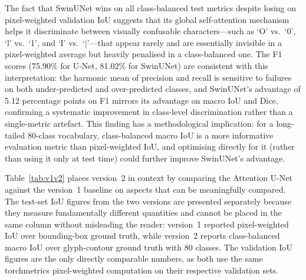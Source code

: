 \documentclass[a4paper,11pt]{article}
\begin{document}
The fact that SwinUNet wins on all class-balanced test metrics despite losing on
pixel-weighted validation IoU suggests that its global self-attention mechanism helps it
discriminate between visually confusable characters---such as `O' vs.\ `0', `l' vs.\ `1',
and `I' vs.\ `|'---that appear rarely and are essentially invisible in a pixel-weighted
average but heavily penalised in a class-balanced one. The F1 scores (75.90\% for U-Net,
81.02\% for SwinUNet) are consistent with this interpretation: the harmonic mean of
precision and recall is sensitive to failures on both under-predicted and over-predicted
classes, and SwinUNet's advantage of 5.12 percentage points on F1 mirrors its advantage
on macro IoU and Dice, confirming a systematic improvement in class-level discrimination
rather than a single-metric artefact. This finding has a methodological implication: for
a long-tailed 80-class vocabulary, class-balanced macro IoU is a more informative
evaluation metric than pixel-weighted IoU, and optimising directly for it (rather than
using it only at test time) could further improve SwinUNet's advantage.

Table~\ref{tab:v1v2} places version~2 in context by comparing the Attention U-Net against
the version~1 baseline on aspects that can be meaningfully compared. The test-set IoU
figures from the two versions are presented separately because they measure fundamentally
different quantities and cannot be placed in the same column without misleading the
reader: version~1 reported pixel-weighted IoU over bounding-box ground truth, while
version~2 reports class-balanced macro IoU over glyph-contour ground truth with 80
classes. The validation IoU figures are the only directly comparable numbers, as both use
the same torchmetrics pixel-weighted computation on their respective validation sets.
\end{document}
